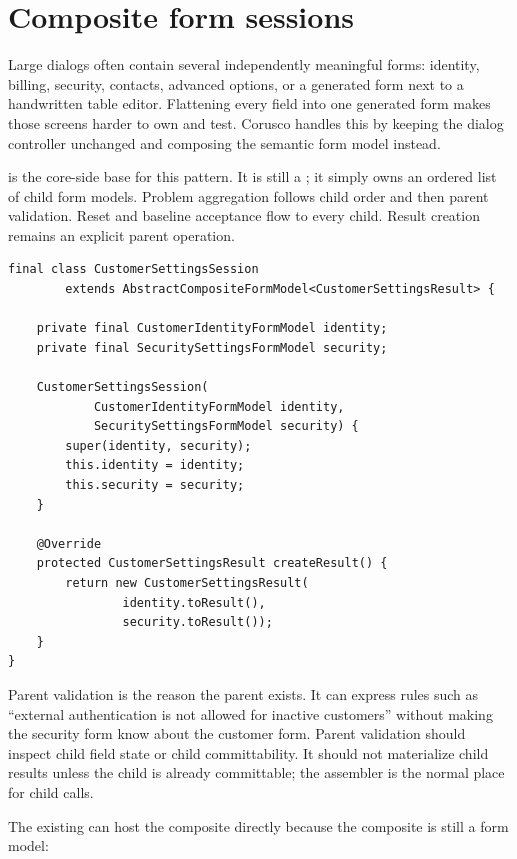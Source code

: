 \section{Composite form sessions}

Large dialogs often contain several independently meaningful forms: identity,
billing, security, contacts, advanced options, or a generated form next to a
handwritten table editor. Flattening every field into one generated form makes
those screens harder to own and test. Corusco handles this by keeping the
dialog controller unchanged and composing the semantic form model instead.

 is the core-side base for this pattern. It is
still a ; it simply owns an ordered list of child form models.
Problem aggregation follows child order and then parent validation. Reset and
baseline acceptance flow to every child. Result creation remains an explicit
parent operation.

\begin{lstlisting}[caption={A handwritten parent session over generated children.}]
final class CustomerSettingsSession
        extends AbstractCompositeFormModel<CustomerSettingsResult> {

    private final CustomerIdentityFormModel identity;
    private final SecuritySettingsFormModel security;

    CustomerSettingsSession(
            CustomerIdentityFormModel identity,
            SecuritySettingsFormModel security) {
        super(identity, security);
        this.identity = identity;
        this.security = security;
    }

    @Override
    protected CustomerSettingsResult createResult() {
        return new CustomerSettingsResult(
                identity.toResult(),
                security.toResult());
    }
}
\end{lstlisting}

Parent validation is the reason the parent exists. It can express rules such
as ``external authentication is not allowed for inactive customers'' without
making the security form know about the customer form. Parent validation
should inspect child field state or child committability. It should not
materialize child results unless the child is already committable; the
assembler is the normal place for child  calls.

The existing  can host the composite directly because the
composite is still a form model:

